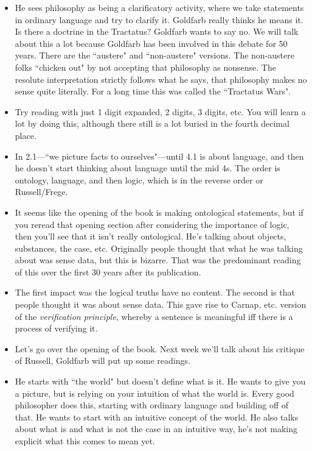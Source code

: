 \documentclass[12pt]{article}
\theoremstyle{definition}
\begin{document}
\begin{itemize}
    \item He sees philosophy as being a clarificatory activity, where we take statements in ordinary language and try to clarify it. Goldfarb really thinks he means it. Is there a doctrine in the Tractatus? Goldfarb wants to say no. We will talk about this a lot because Goldfarb has been involved in this debate for 50 years. There  are the ``austere" and ``non-austere" versions. The non-austere folks ``chicken out" by not accepting that philosophy as nonsense. The resolute interpretation strictly follows what he says, that philosophy makes no sense quite literally. For a long time this was called the ``Tractatus Wars".
    \item Try reading with just 1 digit expanded, 2 digits, 3 digits, etc. You will learn a lot by doing this, although there still is a lot buried in the fourth decimal place.
    \item In 2.1---``we picture facts to ourselves"---until 4.1 is about language, and then he doesn't start thinking about language until the mid 4s. The order is ontology, language, and then logic, which is in the reverse order or Russell/Frege.
    \item It seems like the opening of the book is making ontological statements, but if you reread that opening section after considering the importance of logic, then you'll see that it isn't really ontological. He's talking about objects, substances, the case, etc. Originally people thought that what he was talking about was sense data, but this is bizarre. That was the predominant reading of this over the first 30 years after its publication.
    \item The first impact was the logical truths have no content. The second is that people thought it was about sense data. This gave rise to Carnap, etc. version of the \textit{verification principle}, whereby a sentence is meaningful iff there is a process of verifying it.
    \item Let's go over the opening of the book. Next week we'll talk about his critique of Russell, Goldfarb will put up some readings. 
    \item He starts with ``the world" but doesn't define what is it. He wants to give you a picture, but is relying on your intuition of what the world is. Every good philosopher does this, starting with ordinary language and building off of that. He wants to start with an intuitive concept of the world. He also talks about what is and what is not the case in an intuitive way, he's not making explicit what this comes to mean yet.

\end{itemize}
\end{document}
